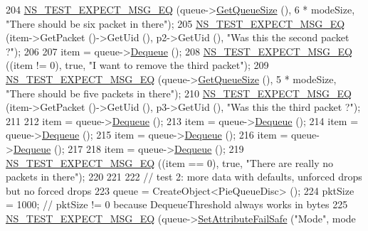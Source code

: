\begin{DoxyCode}
204   \hyperlink{group__testing_ga7304ba46a28d8cf08dfdfd6499cf7068}{NS\_TEST\_EXPECT\_MSG\_EQ} (queue->\hyperlink{classns3_1_1PieQueueDisc_ae8675ca8d1c18d43ca678f30040e8510}{GetQueueSize} (), 6 * modeSize, \textcolor{stringliteral}{"There
       should be six packet in there"});
205   \hyperlink{group__testing_ga7304ba46a28d8cf08dfdfd6499cf7068}{NS\_TEST\_EXPECT\_MSG\_EQ} (item->GetPacket ()->GetUid (), p2->GetUid (), \textcolor{stringliteral}{"Was this the
       second packet ?"});
206 
207   item = queue->\hyperlink{classns3_1_1QueueDisc_a6c13fc489822c1487f61c2289f2e3629}{Dequeue} ();
208   \hyperlink{group__testing_ga7304ba46a28d8cf08dfdfd6499cf7068}{NS\_TEST\_EXPECT\_MSG\_EQ} ((item != 0), \textcolor{keyword}{true}, \textcolor{stringliteral}{"I want to remove the third packet"});
209   \hyperlink{group__testing_ga7304ba46a28d8cf08dfdfd6499cf7068}{NS\_TEST\_EXPECT\_MSG\_EQ} (queue->\hyperlink{classns3_1_1PieQueueDisc_ae8675ca8d1c18d43ca678f30040e8510}{GetQueueSize} (), 5 * modeSize, \textcolor{stringliteral}{"There
       should be five packets in there"});
210   \hyperlink{group__testing_ga7304ba46a28d8cf08dfdfd6499cf7068}{NS\_TEST\_EXPECT\_MSG\_EQ} (item->GetPacket ()->GetUid (), p3->GetUid (), \textcolor{stringliteral}{"Was this the
       third packet ?"});
211 
212   item = queue->\hyperlink{classns3_1_1QueueDisc_a6c13fc489822c1487f61c2289f2e3629}{Dequeue} ();
213   item = queue->\hyperlink{classns3_1_1QueueDisc_a6c13fc489822c1487f61c2289f2e3629}{Dequeue} ();
214   item = queue->\hyperlink{classns3_1_1QueueDisc_a6c13fc489822c1487f61c2289f2e3629}{Dequeue} ();
215   item = queue->\hyperlink{classns3_1_1QueueDisc_a6c13fc489822c1487f61c2289f2e3629}{Dequeue} ();
216   item = queue->\hyperlink{classns3_1_1QueueDisc_a6c13fc489822c1487f61c2289f2e3629}{Dequeue} ();
217 
218   item = queue->\hyperlink{classns3_1_1QueueDisc_a6c13fc489822c1487f61c2289f2e3629}{Dequeue} ();
219   \hyperlink{group__testing_ga7304ba46a28d8cf08dfdfd6499cf7068}{NS\_TEST\_EXPECT\_MSG\_EQ} ((item == 0), \textcolor{keyword}{true}, \textcolor{stringliteral}{"There are really no packets in there"});
220 
221 
222   \textcolor{comment}{// test 2: more data with defaults, unforced drops but no forced drops}
223   queue = CreateObject<PieQueueDisc> ();
224   pktSize = 1000;  \textcolor{comment}{// pktSize != 0 because DequeueThreshold always works in bytes}
225   \hyperlink{group__testing_ga7304ba46a28d8cf08dfdfd6499cf7068}{NS\_TEST\_EXPECT\_MSG\_EQ} (queue->\hyperlink{classns3_1_1ObjectBase_aa7d333004e970f925a4ed5df275541b5}{SetAttributeFailSafe} (\textcolor{stringliteral}{"Mode"}, mode

\end{DoxyCode}
